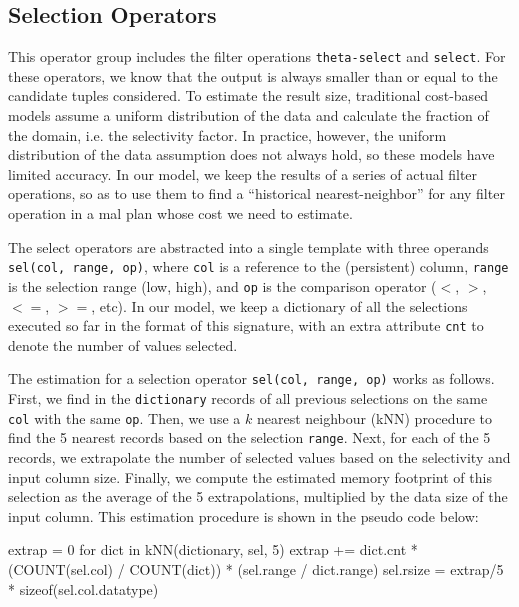 \documentclass[conference]{IEEEtran}
\def\Skip{\par\medskip\nobreak\noindent}
\begin{document}
\subsection{Selection Operators}
This operator group includes the filter operations \texttt{\small theta-select} and \texttt{\small select}.
For these operators, we know that the output is always smaller than or equal to the candidate tuples considered.
To estimate the result size, traditional cost-based models assume a uniform distribution of the data and calculate the fraction of the domain, i.e. the selectivity factor.
In practice, however, the uniform distribution of the data assumption does not always hold, so these models have limited accuracy.
In our model, we keep the results of a series of actual filter operations, so as to use them to find a ``historical nearest-neighbor'' for any filter operation in a {\sc mal} plan whose cost we need to estimate.

The select operators are abstracted into a single template with three operands \texttt{\small sel(col, range, op)}, where \texttt{\small col} is a reference to the (persistent) column, \texttt{\small range} is the selection range (low, high), and \texttt{\small op} is the comparison operator ($<$, $>$, $<=$, $>=$, etc).
In our model, we keep a dictionary of all the selections executed so far in the format of this signature, with an extra attribute \texttt{\small cnt} to denote the number of values selected.

The estimation for a selection operator \texttt{\small sel(col, range, op)} works as follows.
First, we find in the \texttt{\small dictionary} records of all previous selections on the same \texttt{\small col} with the same \texttt{\small op}.
Then, we use a $k$ nearest neighbour (kNN) procedure to find the 5 nearest records based on the selection \texttt{\small range}.
Next, for each of the 5 records, we extrapolate the number of selected values based on the selectivity and input column size. 
Finally, we compute the estimated memory footprint of this selection as the average of the 5 extrapolations, multiplied by the data size of the input column.
This estimation procedure is shown in the pseudo code below:
\begin{verb}
extrap = 0
for dict in kNN(dictionary, sel, 5)
  extrap += dict.cnt * (COUNT(sel.col) / COUNT(dict)) * 
            (sel.range / dict.range)
sel.rsize = extrap/5 * sizeof(sel.col.datatype)
\end{verb}
\end{document}
